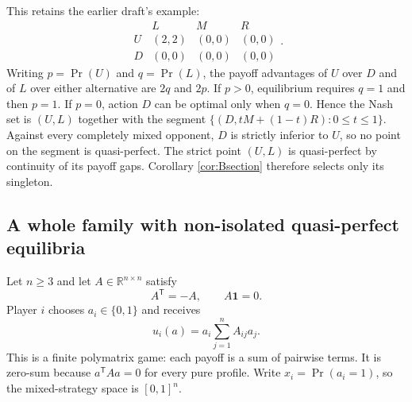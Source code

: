 \documentclass[11pt]{article}
\theoremstyle{definition}
\newcommand{\R}{\mathbb R}
\begin{document}
This retains the earlier draft's example:
\[
 \begin{array}{c|ccc}&L&M&R\\\hline
 U&(2,2)&(0,0)&(0,0)\\
 D&(0,0)&(0,0)&(0,0)
 \end{array}.
\]
Writing $p=\Pr(U)$ and $q=\Pr(L)$, the payoff advantages of $U$ over $D$
and of $L$ over either alternative are $2q$ and $2p$. If $p>0$, equilibrium
requires $q=1$ and then $p=1$. If $p=0$, action $D$ can be optimal only
when $q=0$. Hence the Nash set is $(U,L)$ together with the segment
$\{(D,tM+(1-t)R):0\le t\le1\}$. Against every completely mixed opponent,
$D$ is strictly inferior to $U$, so no point on the segment is quasi-perfect.
The strict point $(U,L)$ is quasi-perfect by continuity of its payoff gaps.
Corollary \ref{cor:Bsection} therefore selects only its singleton.

\subsection{A whole family with non-isolated quasi-perfect equilibria}\label{sec:polymatrix}
Let $n\ge3$ and let $A\in\R^{n\times n}$ satisfy
\[
 A^{\mathsf T}=-A,\qquad A\mathbf 1=0.
\]
Player $i$ chooses $a_i\in\{0,1\}$ and receives
\begin{equation}\label{eq:skewgame}
 u_i(a)=a_i\sum_{j=1}^n A_{ij}a_j.
\end{equation}
This is a finite polymatrix game: each payoff is a sum of pairwise terms.
It is zero-sum because $a^{\mathsf T}Aa=0$ for every pure profile.
Write $x_i=\Pr(a_i=1)$, so the mixed-strategy space is $[0,1]^n$.
\end{document}
